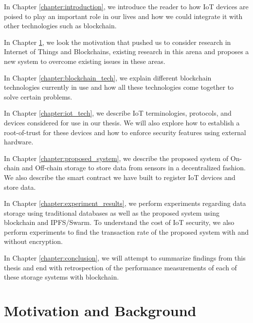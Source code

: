 \documentclass[11pt,openright]{report}
\begin{document}
In Chapter \ref{chapter:introduction}, we introduce the reader to how IoT devices are poised to play an important role in our lives and how we could integrate it with other technologies such as blockchain.\newline

\noindent In Chapter \ref{chapter:background}, we look the motivation that pushed us to consider research in Internet of Things and Blockchains, existing research in this arena and proposes a new system to overcome existing issues in these areas. \newline

\noindent In Chapter \ref{chapter:blockchain_tech}, we explain different blockchain technologies currently in use and how all these technologies come together to solve certain problems. \newline

\noindent In Chapter \ref{chapter:iot_tech}, we describe IoT terminologies, protocols, and devices considered for use in our thesis. We will also explore how to establish a root-of-trust for these devices and how to enforce security features using external hardware. \newline

\noindent In Chapter \ref{chapter:proposed_system}, we describe the proposed system of On-chain and Off-chain storage to store data from sensors in a decentralized fashion. We also describe the smart contract we have built to register IoT devices and store data.\newline

\noindent In Chapter \ref{chapter:experiment_results}, we perform experiments regarding data storage using traditional databases as well as the proposed system using blockchain and IPFS/Swarm. To understand the cost of IoT security, we also perform experiments to find the transaction rate of the proposed system with and without encryption.\newline

\noindent In Chapter \ref{chapter:conclusion}, we will attempt to summarize findings from this thesis and end with retrospection of the performance measurements of each of these storage systems with blockchain.\newline 

\chapter{Motivation and Background} \label{chapter:background}
\end{document}
